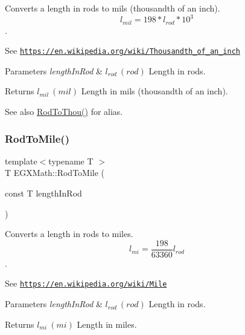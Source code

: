 Converts a length in rods to mils (thousandth of an inch). \[ l_{mil}=198 * l_{rod} * 10^{3} \]. 

See \href{https://en.wikipedia.org/wiki/Thousandth_of_an_inch}{\tt https\+://en.\+wikipedia.\+org/wiki/\+Thousandth\+\_\+of\+\_\+an\+\_\+inch} 
\begin{DoxyParams}{Parameters}
{\em length\+In\+Rod} & $ l_{rod}\ (rod)$ Length in rods. \\
\hline
\end{DoxyParams}
\begin{DoxyReturn}{Returns}
$ l_{mil}\ (mil)$ Length in mils (thousandth of an inch). 
\end{DoxyReturn}
\begin{DoxySeeAlso}{See also}
\mbox{\hyperlink{group___e_g_x_math-_conversions-_length_conversions-_surveyors-_rod-_imperial_ga1bd077740ba076ebf1e9e99cbeddf6cf}{Rod\+To\+Thou()}} for alias. 
\end{DoxySeeAlso}
\mbox{\label{group___e_g_x_math-_conversions-_length_conversions-_surveyors-_rod-_imperial_ga0ef0f9142bc6954af0961dabcf231abe}} 
\subsubsection{\texorpdfstring{Rod\+To\+Mile()}{RodToMile()}}
{\footnotesize\ttfamily template$<$typename T $>$ \\
T E\+G\+X\+Math\+::\+Rod\+To\+Mile (\begin{DoxyParamCaption}\item[{const T}]{length\+In\+Rod }\end{DoxyParamCaption})}



Converts a length in rods to miles. \[ l_{mi}=\frac{198}{63360} l_{rod} \]. 

See \href{https://en.wikipedia.org/wiki/Mile}{\tt https\+://en.\+wikipedia.\+org/wiki/\+Mile} 
\begin{DoxyParams}{Parameters}
{\em length\+In\+Rod} & $ l_{rod}\ (rod)$ Length in rods. \\
\hline
\end{DoxyParams}
\begin{DoxyReturn}{Returns}
$ l_{mi}\ (mi)$ Length in miles. 
\end{DoxyReturn}
\mbox{\label{group___e_g_x_math-_conversions-_length_conversions-_surveyors-_rod-_imperial_ga1bd077740ba076ebf1e9e99cbeddf6cf}} 

